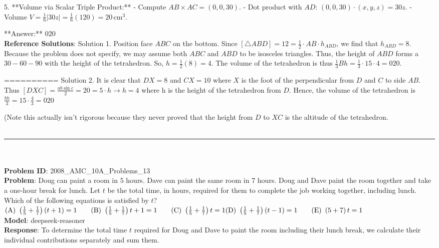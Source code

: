 {5. **Volume via Scalar Triple Product:**
   - Compute \( AB \times AC = (0,0,30) \).
   - Dot product with \( AD \): \( (0,0,30) \cdot (x, y, z) = 30z \).
   - Volume \( V = \frac{1}{6}|30z| = \frac{1}{6}(120) = 20 \, \text{cm}^3 \).

**Answer:** \(\boxed{020}\) \\
    \textbf{Reference Solutions}: Solution 1. Position face $ABC$ on the bottom. Since $[\triangle ABD] = 12 = \frac{1}{2} \cdot AB \cdot h_{ABD}$, we find that $h_{ABD} = 8$. Because the problem does not specify, we may assume both $ABC$ and $ABD$ to be isosceles triangles. Thus, the height of $ABD$ forms a $30-60-90$ with the height of the tetrahedron. So, $h = \frac{1}{2} (8) = 4$. The volume of the tetrahedron is thus $\frac{1}{3}Bh = \frac{1}{3} \cdot15 \cdot 4 = \boxed{020}$.


==========
Solution 2. It is clear that $DX=8$ and $CX=10$ where $X$ is the foot of the perpendicular from $D$ and $C$ to side $AB$. Thus $[DXC]=\frac{ab\sin{c}}{2}=20=5 \cdot h \rightarrow h = 4$ where h is the height of the tetrahedron from $D$. Hence, the volume of the tetrahedron is $\frac{bh}{3}=15\cdot \frac{4}{3}=\boxed{020}$

(Note this actually isn't rigorous because they never proved that the height from $D$ to $XC$ is the altitude of the tetrahedron. \\
    \vspace{0.3cm} \\
    \hrule \\
    \vspace{0.5cm} \\
    \textbf{Problem ID}: 2008_AMC_10A_Problems_13 \\
    \textbf{Problem}: Doug can paint a room in $5$ hours. Dave can paint the same room in $7$ hours. Doug and Dave paint the room together and take a one-hour break for lunch. Let $t$ be the total time, in hours, required for them to complete the job working together, including lunch. Which of the following equations is satisfied by $t$?
$\mathrm{(A)}\ \left(\frac{1}{5}+\frac{1}{7}\right)\left(t+1\right)=1\qquad\mathrm{(B)}\ \left(\frac{1}{5}+\frac{1}{7}\right)t+1=1\qquad\mathrm{(C)}\ \left(\frac{1}{5}+\frac{1}{7}\right)t=1\\\mathrm{(D)}\ \left(\frac{1}{5}+\frac{1}{7}\right)\left(t-1\right)=1\qquad\mathrm{(E)}\ \left(5+7\right)t=1$ \\
    \textbf{Model}: deepseek-reasoner \\
    \textbf{Response}: To determine the total time \( t \) required for Doug and Dave to paint the room including their lunch break, we calculate their individual contributions separately and sum them. 

}
